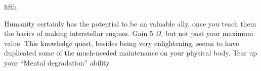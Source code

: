\documentclass[notebook]{guildcamp1}
\begin{document}
\begin{page}{fifth}

Humanity certainly has the potential to be an valuable ally, once you teach them the basics of making interstellar engines.
Gain 5 $\Omega$, but not past your maximum value. This knowledge quest, besides being very enlightening, seems to have duplicated some of the much-needed maintenance on your physical body. Tear up your ``Mental degradation'' ability.

\end{page}

\endnotebook
\end{document}
